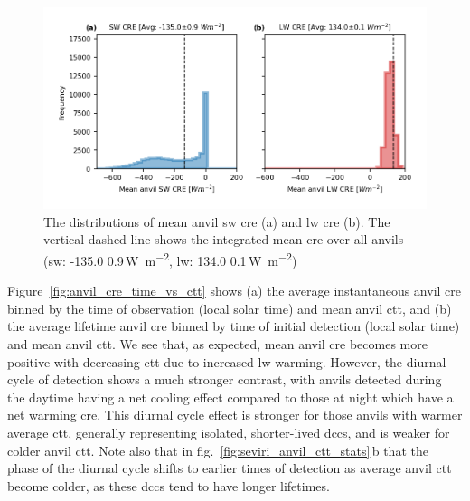 \begin{figure}[tp]
    \includegraphics[width=\textwidth]{figures/chapter4_15.png}
    \caption[
    The distributions of mean anvil \acrshort{sw} \acrshort{cre} and \acrshort{lw} \acrshort{cre}
    ]{
    The distributions of mean anvil \acrshort{sw} \acrshort{cre} (a) and \acrshort{lw} \acrshort{cre} (b). The vertical dashed line shows the integrated mean \acrshort{cre} over all anvils (\acrshort{sw}: -135.0\,\textpm\,0.9\,\unit{W m^{-2}}, \acrshort{lw}: 134.0\,\textpm\,0.1\,\unit{W m^{-2}})
    }
    \label{fig:anvil_sw_lw_cre}
\end{figure}


Figure~\ref{fig:anvil_cre_time_vs_ctt} shows (a) the average instantaneous anvil \acrshort{cre} binned by the time of observation (local solar time) and mean anvil \acrshort{ctt}, and (b) the average lifetime anvil \acrshort{cre} binned by time of initial detection (local solar time) and mean anvil \acrshort{ctt}.
We see that, as expected, mean anvil \acrshort{cre} becomes more positive with decreasing \acrshort{ctt} due to increased \acrshort{lw} warming. 
However, the diurnal cycle of detection shows a much stronger contrast, with anvils detected during the daytime having a net cooling effect compared to those at night which have a net warming \acrshort{cre}. 
This diurnal cycle effect is stronger for those anvils with warmer average \acrshort{ctt}, generally representing isolated, shorter-lived \acrshort{dcc}s, and is weaker for colder anvil \acrshort{ctt}. 
Note also that in fig.~\ref{fig:seviri_anvil_ctt_stats}\,b that the phase of the diurnal cycle shifts to earlier times of detection as average anvil \acrshort{ctt} become colder, as these \acrshort{dcc}s tend to have longer lifetimes.



